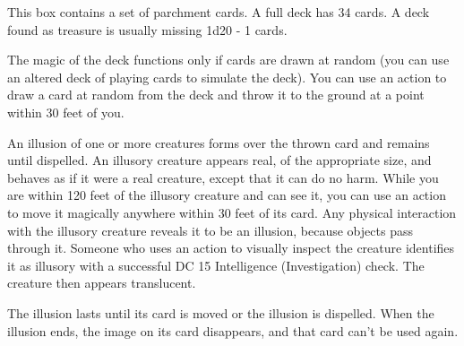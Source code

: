 \documentclass[10pt,a4paper,twoside,bg=print,twocolumn,openany,nodeprecatedcode]{dndbook}
\begin{document}
This box contains a set of parchment cards. A full deck has 34 cards. A deck found as treasure is usually missing 1d20 - 1 cards.

The magic of the deck functions only if cards are drawn at random (you can use an altered deck of playing cards to simulate the deck). You can use an action to draw a card at random from the deck and throw it to the ground at a point within 30 feet of you.

An illusion of one or more creatures forms over the thrown card and remains until dispelled. An illusory creature appears real, of the appropriate size, and behaves as if it were a real creature, except that it can do no harm. While you are within 120 feet of the illusory creature and can see it, you can use an action to move it magically anywhere within 30 feet of its card. Any physical interaction with the illusory creature reveals it to be an illusion, because objects pass through it. Someone who uses an action to visually inspect the creature identifies it as illusory with a successful DC 15 Intelligence (Investigation) check. The creature then appears translucent.

The illusion lasts until its card is moved or the illusion is dispelled. When the illusion ends, the image on its card disappears, and that card can't be used again.
\end{document}

